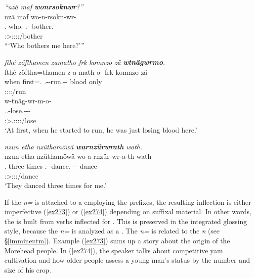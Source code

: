 \begin{exe}
	\ex \emph{``nzä maf \textbf{wonrsoknwr}?''}\\
	\glll nzä maf wo-n-rsokn-wr-\Zero{}\\
	\Fsg.\Abs{} who.\Erg{} \Fsg.\Alph-\Venit-bother.\Ext-\Ndu-\Stsg{}\\
	{} {} \footnotesize{\Stsg:\Sbj>\Fsg:\Obj:\Nonpast:\Ipfv:\Venit/bother}\\
	\trans ```Who bothers me here?''' 
	\label{ex276}
\end{exe}
\begin{exe}
	\ex \emph{fthé zöfthamen zamatho frk komnzo zä \textbf{wtnägwrmo}.}\\
	\glll fthé zöftha=thamen z-a-math-o-\Zero{} frk komnzo zä\\
	when first=\Temp.\Loc{} \M.\Gam-\Ndu-run.\Rs-\Andat-\Stsg{} blood only \Prox{}\\
	{} {} \footnotesize{\Stsg:\Sbj:\Rpst:\Pfv:\Andat/run} {} {} {}\\
	\sn
	\glll w-tnäg-wr-m-o-\Zero\\
	\Tsg.\F.\Alph-lose.\Ext-\Ndu-\Dur-\Andat{}\\
	\footnotesize{\Sg:\Sbj>\Tsg.\F:\Obj:\Rpst:\Dur:\Andat/lose}\\
	\trans `At first, when he started to run, he was just losing blood here.'\\ 
	\label{ex275}
\end{exe}
\begin{exe}
	\ex \emph{nzun etha nzüthamöwä \textbf{warnzürwrath} wath.}\\
	\glll nzun etha nzüthamöwä wo-a-rnzür-wr-a-th wath\\
	\Fsg.\Dat{} three times \Fsg.\Alph-\Vc-dance.\Ext-\Ndu-\Pst-\Stnsg{} dance\\
	{} {} {} \footnotesize{\Stpl:\Sbj>\Fsg:\Io:\Pst:\Ipfv/dance} {}\\
	\trans `They danced three times for me.'\\ 
	\label{ex277}
\end{exe}

If the  \emph{n=} is attached to a  employing the \Alph{} prefixes, the resulting inflection is either  imperfective (\ref{ex273}) or   (\ref{ex274}) depending on suffixal material. In other words, the  is built from verbs inflected for . This is preserved in the integrated glossing style, because the \emph{n=} is analyzed as a . The \emph{n=} is related to the   \emph{n} (see \S{}\ref{imminentm}). Example (\ref{ex273}) sums up a story about the origin of the Morehead people. In (\ref{ex274}), the speaker talks about competitive yam cultivation and how older people assess a young man's status by the number and size of his crop.

